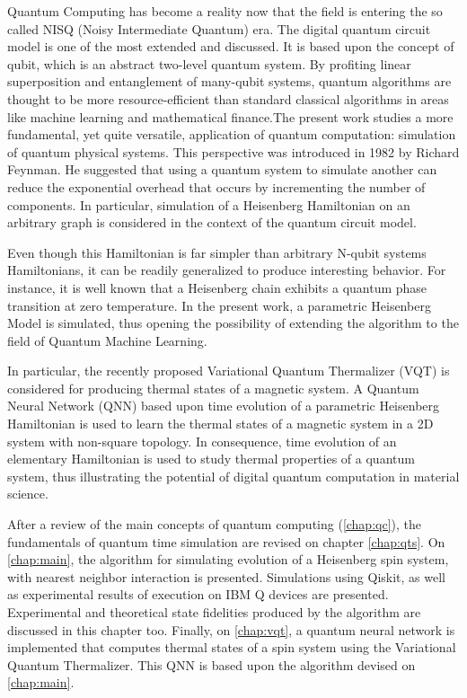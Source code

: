 Quantum Computing has become a reality now that the field is entering the so called NISQ (Noisy Intermediate Quantum) era. The digital quantum circuit model is one of the most extended and discussed. It is based upon the concept of qubit, which is an abstract two-level quantum system. By profiting linear superposition and entanglement of many-qubit systems, quantum algorithms are thought to be more resource-efficient than standard classical algorithms in areas like machine learning and mathematical finance.The present work studies a more fundamental, yet quite versatile, application of quantum computation: simulation of quantum physical systems. This perspective was introduced in 1982 by Richard Feynman. He suggested that using a quantum system to simulate another can reduce the exponential overhead that occurs by incrementing the number of components. In particular, simulation of a Heisenberg Hamiltonian on an arbitrary graph is considered in the context of the quantum circuit model.

Even though this Hamiltonian is far simpler than arbitrary N-qubit systems Hamiltonians, it can be readily generalized to produce interesting behavior. For instance, it is well known that a Heisenberg chain exhibits a quantum phase transition at zero temperature. In the present work, a parametric Heisenberg Model is simulated, thus opening the possibility of extending the algorithm to the field of Quantum Machine Learning.

In particular, the recently proposed Variational Quantum Thermalizer (VQT) \cite{verdon2019quantum} is considered for producing thermal states of a magnetic system. A Quantum Neural Network (QNN) based upon time evolution of a parametric Heisenberg Hamiltonian is used to learn the thermal states of a magnetic system in a 2D system with non-square topology. In consequence, time evolution of an elementary Hamiltonian is used to study thermal properties of a quantum system, thus illustrating the potential of digital quantum computation in material science.

After a review of the main concepts of quantum computing (\autoref{chap:qc}), the fundamentals of quantum time simulation are revised on chapter \autoref{chap:qts}. On \autoref{chap:main}, the algorithm for simulating evolution of a Heisenberg spin system, with nearest neighbor interaction is presented. Simulations using Qiskit, as well as experimental results of execution on IBM Q devices are presented. Experimental and theoretical state fidelities produced by the algorithm are discussed in this chapter too. Finally, on \autoref{chap:vqt}, a quantum neural network is implemented that computes thermal states of a spin system using the Variational Quantum Thermalizer. This QNN is based upon the algorithm devised on \autoref{chap:main}.